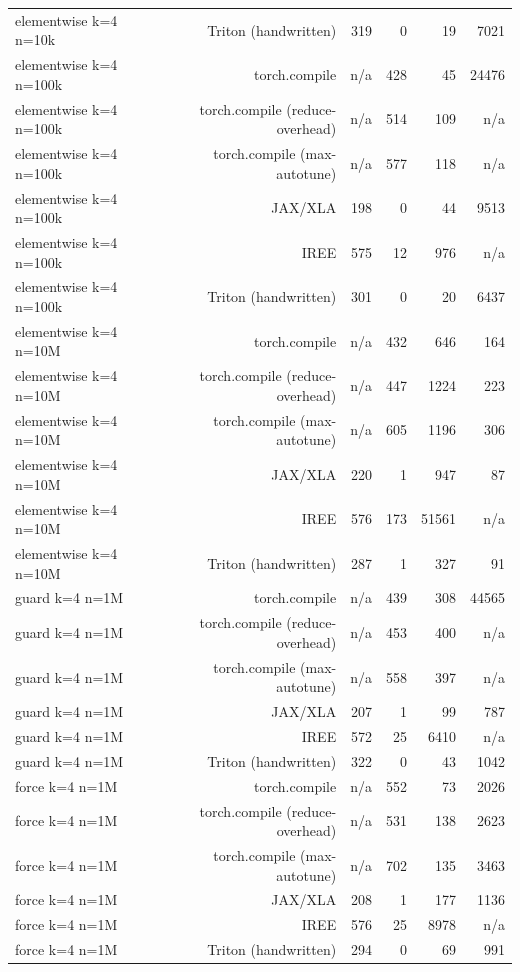 \begin{tabular}{lrrrrr}
elementwise k=4 n=10k & Triton (handwritten) & 319 & 0 & 19 & 7021 \\
elementwise k=4 n=100k & torch.compile & n/a & 428 & 45 & 24476 \\
elementwise k=4 n=100k & torch.compile (reduce-overhead) & n/a & 514 & 109 & n/a \\
elementwise k=4 n=100k & torch.compile (max-autotune) & n/a & 577 & 118 & n/a \\
elementwise k=4 n=100k & JAX/XLA & 198 & 0 & 44 & 9513 \\
elementwise k=4 n=100k & IREE & 575 & 12 & 976 & n/a \\
elementwise k=4 n=100k & Triton (handwritten) & 301 & 0 & 20 & 6437 \\
elementwise k=4 n=10M & torch.compile & n/a & 432 & 646 & 164 \\
elementwise k=4 n=10M & torch.compile (reduce-overhead) & n/a & 447 & 1224 & 223 \\
elementwise k=4 n=10M & torch.compile (max-autotune) & n/a & 605 & 1196 & 306 \\
elementwise k=4 n=10M & JAX/XLA & 220 & 1 & 947 & 87 \\
elementwise k=4 n=10M & IREE & 576 & 173 & 51561 & n/a \\
elementwise k=4 n=10M & Triton (handwritten) & 287 & 1 & 327 & 91 \\
guard k=4 n=1M & torch.compile & n/a & 439 & 308 & 44565 \\
guard k=4 n=1M & torch.compile (reduce-overhead) & n/a & 453 & 400 & n/a \\
guard k=4 n=1M & torch.compile (max-autotune) & n/a & 558 & 397 & n/a \\
guard k=4 n=1M & JAX/XLA & 207 & 1 & 99 & 787 \\
guard k=4 n=1M & IREE & 572 & 25 & 6410 & n/a \\
guard k=4 n=1M & Triton (handwritten) & 322 & 0 & 43 & 1042 \\
force k=4 n=1M & torch.compile & n/a & 552 & 73 & 2026 \\
force k=4 n=1M & torch.compile (reduce-overhead) & n/a & 531 & 138 & 2623 \\
force k=4 n=1M & torch.compile (max-autotune) & n/a & 702 & 135 & 3463 \\
force k=4 n=1M & JAX/XLA & 208 & 1 & 177 & 1136 \\
force k=4 n=1M & IREE & 576 & 25 & 8978 & n/a \\
force k=4 n=1M & Triton (handwritten) & 294 & 0 & 69 & 991 \\

\end{tabular}
